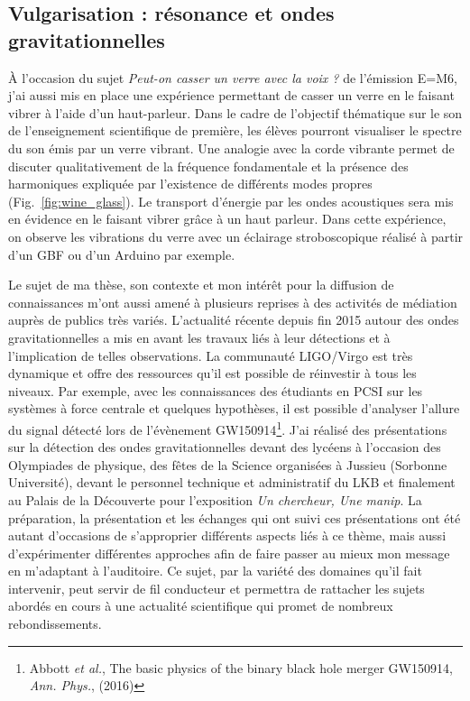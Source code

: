 \documentclass[12pt,a4paper]{article}
\begin{document}
\subsection{Vulgarisation : résonance et ondes gravitationnelles}

À l'occasion du sujet \textit{Peut-on casser un verre avec la voix ?} de l'émission E=M6, j'ai aussi mis en place une expérience permettant de casser un verre en le faisant vibrer à l'aide d'un haut-parleur.
Dans le cadre de l'objectif thématique sur le son de l'enseignement scientifique de première, les élèves pourront visualiser le spectre du son émis par un verre vibrant.
Une analogie avec la corde vibrante permet de discuter qualitativement de la fréquence fondamentale et la présence des harmoniques expliquée par l'existence de différents modes propres (Fig.~\ref{fig:wine_glass}).
Le transport d'énergie par les ondes acoustiques sera mis en évidence en le faisant vibrer grâce à un haut parleur.
Dans cette expérience, on observe les vibrations du verre avec un éclairage stroboscopique réalisé à partir d'un GBF ou d'un Arduino par exemple.

Le sujet de ma thèse, son contexte et mon intérêt pour la diffusion de connaissances m'ont aussi amené à plusieurs reprises à des activités de médiation auprès de publics très variés.
L'actualité récente depuis fin 2015 autour des ondes gravitationnelles a mis en avant les travaux liés à leur détections et à l'implication de telles observations.
La communauté LIGO/Virgo est très dynamique et offre des ressources qu'il est possible de réinvestir à tous les niveaux.
Par exemple, avec les connaissances des étudiants en PCSI sur les systèmes à force centrale et quelques hypothèses, il est possible d'analyser l'allure du signal détecté lors de l'évènement GW150914\footnote{Abbott \textit{et al.}, The basic physics of the binary black hole merger GW150914, \textit{Ann. Phys.}, (2016)}.
J'ai réalisé des présentations sur la détection des ondes gravitationnelles devant des lycéens à l'occasion des Olympiades de physique, des fêtes de la Science organisées à Jussieu (Sorbonne Université), devant le personnel technique et administratif du LKB et finalement au Palais de la Découverte pour l'exposition \textit{Un chercheur, Une manip}.
La préparation, la présentation et les échanges qui ont suivi ces présentations ont été autant d'occasions de s'approprier différents aspects liés à ce thème, mais aussi d'expérimenter différentes approches afin de faire passer au mieux mon message en m'adaptant à l'auditoire.
Ce sujet, par la variété des domaines qu'il fait intervenir, peut servir de fil conducteur et permettra de rattacher les sujets abordés en cours à une actualité scientifique qui promet de nombreux rebondissements.
\end{document}
